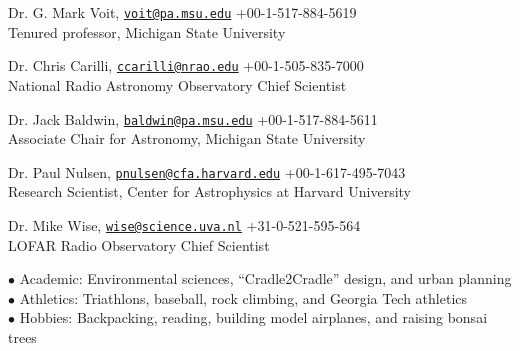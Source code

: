 \documentclass[12pt]{cv}
\begin{document}
\begin{llist}
Dr. G. Mark Voit, \href{mailto:voit@pa.msu.edu}{\tt voit@pa.msu.edu} \hfill +00-1-517-884-5619\\
Tenured professor, Michigan State University

Dr. Chris Carilli, \href{mailto:ccarilli@nrao.edu}{\tt ccarilli@nrao.edu} \hfill +00-1-505-835-7000\\
National Radio Astronomy Observatory Chief Scientist

Dr. Jack Baldwin, \href{mailto:baldwin@pa.msu.edu}{\tt baldwin@pa.msu.edu} \hfill +00-1-517-884-5611\\
Associate Chair for Astronomy, Michigan State University

Dr. Paul Nulsen, \href{mailto:pnulsen@cfa.harvard.edu}{\tt pnulsen@cfa.harvard.edu} \hfill +00-1-617-495-7043\\
Research Scientist, Center for Astrophysics at Harvard University

Dr. Mike Wise, \href{mailto:wise@science.uva.nl}{\tt wise@science.uva.nl} \hfill +31-0-521-595-564\\
LOFAR Radio Observatory Chief Scientist


$\bullet$ Academic: Environmental sciences, ``Cradle2Cradle'' design, and urban planning\\
$\bullet$ Athletics: Triathlons, baseball, rock climbing, and Georgia Tech athletics\\
$\bullet$ Hobbies: Backpacking, reading, building model airplanes, and raising bonsai trees\\

\end{llist}
\end{document}
